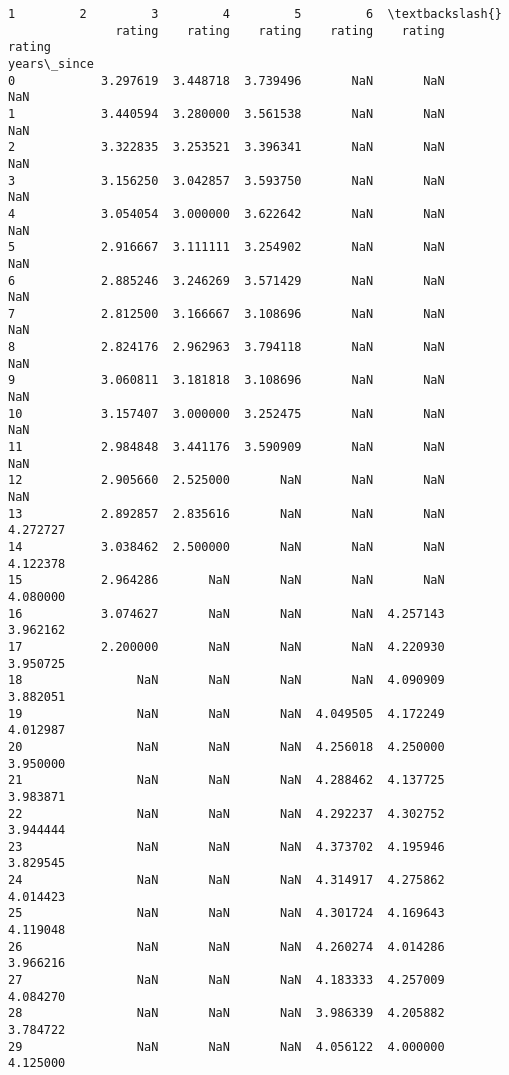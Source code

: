 \documentclass[11pt]{article}
\makeatletter
\newcommand{\boxspacing}{\kern\kvtcb@left@rule\kern\kvtcb@boxsep}
\newcommand{\prompt}[4]{
        {\ttfamily\llap{{\color{#2}[#3]:\hspace{3pt}#4}}\vspace{-\baselineskip}}
    }
\makeatother
\begin{document}
            \begin{tcolorbox}[breakable, size=fbox, boxrule=.5pt, pad at break*=1mm, opacityfill=0]
\prompt{Out}{outcolor}{63}{\boxspacing}
\begin{Verbatim}[commandchars=\\\{\}]
                    1         2         3         4         5         6  \textbackslash{}
               rating    rating    rating    rating    rating    rating
years\_since
0            3.297619  3.448718  3.739496       NaN       NaN       NaN
1            3.440594  3.280000  3.561538       NaN       NaN       NaN
2            3.322835  3.253521  3.396341       NaN       NaN       NaN
3            3.156250  3.042857  3.593750       NaN       NaN       NaN
4            3.054054  3.000000  3.622642       NaN       NaN       NaN
5            2.916667  3.111111  3.254902       NaN       NaN       NaN
6            2.885246  3.246269  3.571429       NaN       NaN       NaN
7            2.812500  3.166667  3.108696       NaN       NaN       NaN
8            2.824176  2.962963  3.794118       NaN       NaN       NaN
9            3.060811  3.181818  3.108696       NaN       NaN       NaN
10           3.157407  3.000000  3.252475       NaN       NaN       NaN
11           2.984848  3.441176  3.590909       NaN       NaN       NaN
12           2.905660  2.525000       NaN       NaN       NaN       NaN
13           2.892857  2.835616       NaN       NaN       NaN  4.272727
14           3.038462  2.500000       NaN       NaN       NaN  4.122378
15           2.964286       NaN       NaN       NaN       NaN  4.080000
16           3.074627       NaN       NaN       NaN  4.257143  3.962162
17           2.200000       NaN       NaN       NaN  4.220930  3.950725
18                NaN       NaN       NaN       NaN  4.090909  3.882051
19                NaN       NaN       NaN  4.049505  4.172249  4.012987
20                NaN       NaN       NaN  4.256018  4.250000  3.950000
21                NaN       NaN       NaN  4.288462  4.137725  3.983871
22                NaN       NaN       NaN  4.292237  4.302752  3.944444
23                NaN       NaN       NaN  4.373702  4.195946  3.829545
24                NaN       NaN       NaN  4.314917  4.275862  4.014423
25                NaN       NaN       NaN  4.301724  4.169643  4.119048
26                NaN       NaN       NaN  4.260274  4.014286  3.966216
27                NaN       NaN       NaN  4.183333  4.257009  4.084270
28                NaN       NaN       NaN  3.986339  4.205882  3.784722
29                NaN       NaN       NaN  4.056122  4.000000  4.125000

\end{Verbatim}
\end{tcolorbox}
\end{document}
